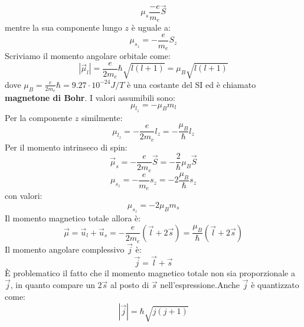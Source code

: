 \documentclass{book}
\begin{document}
    \begin{equation}
        \mu_{s} \frac{-e}{m_{e}}\vec{S}
    \end{equation}
    mentre la sua componente lungo $z$ è uguale a:
    \begin{equation}
        \mu_{s_{z}} = -\frac{e}{m_{e}}S_{z}
    \end{equation}
    Scriviamo il momento angolare orbitale come:
    \begin{equation}
        |\vec{\mu}_{l}| = \frac{e}{2m_{e}} \hbar \sqrt{l(l+1)} = \mu_{B}\sqrt{l(l+1)}
    \end{equation}
    dove $\mu_{B} = \displaystyle \frac{e}{2m_{e}} \hbar = 9.27 \cdot 10^{-24} J/T$ è una costante del SI ed è chiamato \textbf{magnetone di Bohr}.
    I valori assumibili sono:
    \begin{equation}
        \mu_{l_{z}} = -\mu_{B}m_{l}
    \end{equation}
    Per la componente $z$ similmente:
    \begin{equation}
        \mu_{l_{z}} = -\frac{e}{2m_e}l_{z} = -\frac{\mu_{B}}{\hbar} l_{z}
    \end{equation}
    Per il momento intrinseco di spin:
    \begin{equation}
        \vec{\mu}_{s} = -\frac{e}{2m_{e}} \vec{S} = -\frac{2}{\hbar} \mu_{B}\vec{S}
    \end{equation}
    \begin{equation}
        \mu_{s_{z}} = -\frac{e}{m_{e}}s_{z} = -2\frac{\mu_{B}}{\hbar} s_{z}
    \end{equation}
    con valori:
    \begin{equation}
        \mu_{s_{z}} = -2 \mu_{B}m_{s}
    \end{equation}
    Il momento magnetico totale allora è:
    \begin{equation}
        \vec{\mu} = \vec{u}_{l}+\vec{u}_{s} = -\frac{e}{2m_{e}}(\vec{l}+2\vec{s}) = \frac{\mu_{B}}{\hbar} (\vec{l}+2\vec{s})
    \end{equation}
    Il momento angolare complessivo $\vec{j}$ è:
    \begin{equation}
        \vec{j} = \vec{l}+\vec{s}
    \end{equation}
    È problematico il fatto che il momento magnetico totale non sia proporzionale a $\vec{j}$, in quanto compare un $2\vec{s}$ al posto di $\vec{s}$ nell'espressione.Anche $\vec{j}$ è quantizzato come:
    \begin{equation}
        |\vec{j}| = \hbar \sqrt{j(j+1)}
    \end{equation}
\end{document}
